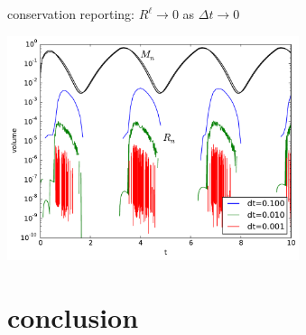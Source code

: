 \documentclass[xcolor={dvipsnames}]{beamer}
\begin{document}
\begin{frame}{conservation reporting: $R^\ell\to 0$ as $\Delta t \to 0$}

\begin{center}
\vspace{-3.3mm}


\vspace{-1.1mm}
\includegraphics[width=0.64\textwidth,keepaspectratio=true]{masstimeseries} \, \phantom{!}
\end{center}
\end{frame}


\section{conclusion}
\end{document}
